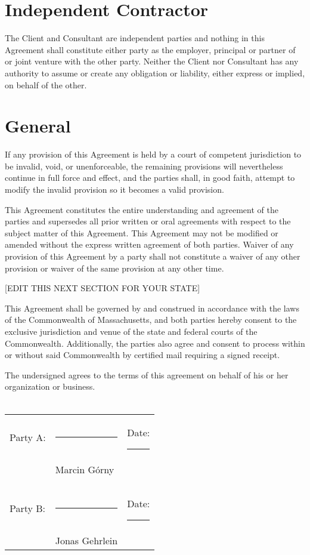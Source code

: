\documentclass[10pt]{article}
\begin{document}
\section{Independent Contractor}

The Client and Consultant are independent parties and nothing in this
Agreement shall constitute either party as the employer, principal or
partner of or joint venture with the other party.  Neither the Client nor
Consultant has any authority to assume or create any obligation or
liability, either express or implied, on behalf of the other.

\section{General}

If any provision of this Agreement is held by a court of competent
jurisdiction to be invalid, void, or unenforceable, the remaining provisions
will nevertheless continue in full force and effect, and the parties shall,
in good faith, attempt to modify the invalid provision so it becomes a valid
provision.

This Agreement constitutes the entire understanding and agreement of the
parties and supersedes all prior written or oral agreements with respect to
the subject matter of this Agreement. This Agreement may not be modified or
amended without the express written agreement of both parties. Waiver of any
provision of this Agreement by a party shall not constitute a waiver of any
other provision or waiver of the same provision at any other time.

[EDIT THIS NEXT SECTION FOR YOUR STATE]

This Agreement shall be governed by and construed in accordance with the
laws of the Commonwealth of Massachusetts, and both parties hereby consent
to the exclusive jurisdiction and venue of the state and federal courts of
the Commonwealth. Additionally, the parties also agree and consent to
process within or without said Commonwealth by certified mail requiring a
signed receipt.

\vspace{1cm} 

\noindent The undersigned agrees to the terms of this agreement on behalf of his or
her organization or business.\\\\

\noindent \begin{tabular}{l l l}
Party A: & \rule{6cm}{.2pt} & Date: \rule{2.4cm}{.2pt}\\
                         & Marcin Górny      & \\\\\\
Party B:          & \rule{6cm}{.2pt} & Date: \rule{2.4cm}{.2pt}\\
                         & Jonas Gehrlein      & \\
\end{tabular}
\end{document}
